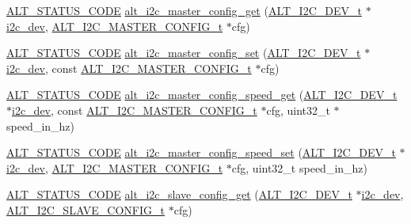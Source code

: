 \begin{DoxyCompactItemize}
\item 
\mbox{\hyperlink{hwlib_8h_abdb0d369f069723ca55d6c94bcaaaa12}{A\+L\+T\+\_\+\+S\+T\+A\+T\+U\+S\+\_\+\+C\+O\+DE}} \mbox{\hyperlink{group__ALT__I2C_ga33fc9aa9f017d7ae7eb0779415e9d69f}{alt\+\_\+i2c\+\_\+master\+\_\+config\+\_\+get}} (\mbox{\hyperlink{structALT__I2C__DEV__s}{A\+L\+T\+\_\+\+I2\+C\+\_\+\+D\+E\+V\+\_\+t}} $\ast$\mbox{\hyperlink{structi2c__dev}{i2c\+\_\+dev}}, \mbox{\hyperlink{group__ALT__I2C_ga4f317dbba3080bb537f6c145ca30d503}{A\+L\+T\+\_\+\+I2\+C\+\_\+\+M\+A\+S\+T\+E\+R\+\_\+\+C\+O\+N\+F\+I\+G\+\_\+t}} $\ast$cfg)
\item 
\mbox{\hyperlink{hwlib_8h_abdb0d369f069723ca55d6c94bcaaaa12}{A\+L\+T\+\_\+\+S\+T\+A\+T\+U\+S\+\_\+\+C\+O\+DE}} \mbox{\hyperlink{group__ALT__I2C_gae1e81c86d394a6cc962598e3e32931d5}{alt\+\_\+i2c\+\_\+master\+\_\+config\+\_\+set}} (\mbox{\hyperlink{structALT__I2C__DEV__s}{A\+L\+T\+\_\+\+I2\+C\+\_\+\+D\+E\+V\+\_\+t}} $\ast$\mbox{\hyperlink{structi2c__dev}{i2c\+\_\+dev}}, const \mbox{\hyperlink{group__ALT__I2C_ga4f317dbba3080bb537f6c145ca30d503}{A\+L\+T\+\_\+\+I2\+C\+\_\+\+M\+A\+S\+T\+E\+R\+\_\+\+C\+O\+N\+F\+I\+G\+\_\+t}} $\ast$cfg)
\item 
\mbox{\hyperlink{hwlib_8h_abdb0d369f069723ca55d6c94bcaaaa12}{A\+L\+T\+\_\+\+S\+T\+A\+T\+U\+S\+\_\+\+C\+O\+DE}} \mbox{\hyperlink{group__ALT__I2C_ga90d8a89d7b447bede11a9c1c79ea3b99}{alt\+\_\+i2c\+\_\+master\+\_\+config\+\_\+speed\+\_\+get}} (\mbox{\hyperlink{structALT__I2C__DEV__s}{A\+L\+T\+\_\+\+I2\+C\+\_\+\+D\+E\+V\+\_\+t}} $\ast$\mbox{\hyperlink{structi2c__dev}{i2c\+\_\+dev}}, const \mbox{\hyperlink{group__ALT__I2C_ga4f317dbba3080bb537f6c145ca30d503}{A\+L\+T\+\_\+\+I2\+C\+\_\+\+M\+A\+S\+T\+E\+R\+\_\+\+C\+O\+N\+F\+I\+G\+\_\+t}} $\ast$cfg, uint32\+\_\+t $\ast$speed\+\_\+in\+\_\+hz)
\item 
\mbox{\hyperlink{hwlib_8h_abdb0d369f069723ca55d6c94bcaaaa12}{A\+L\+T\+\_\+\+S\+T\+A\+T\+U\+S\+\_\+\+C\+O\+DE}} \mbox{\hyperlink{group__ALT__I2C_gab7a9d3d9d126cce421b7a9e0254b2a6e}{alt\+\_\+i2c\+\_\+master\+\_\+config\+\_\+speed\+\_\+set}} (\mbox{\hyperlink{structALT__I2C__DEV__s}{A\+L\+T\+\_\+\+I2\+C\+\_\+\+D\+E\+V\+\_\+t}} $\ast$\mbox{\hyperlink{structi2c__dev}{i2c\+\_\+dev}}, \mbox{\hyperlink{group__ALT__I2C_ga4f317dbba3080bb537f6c145ca30d503}{A\+L\+T\+\_\+\+I2\+C\+\_\+\+M\+A\+S\+T\+E\+R\+\_\+\+C\+O\+N\+F\+I\+G\+\_\+t}} $\ast$cfg, uint32\+\_\+t speed\+\_\+in\+\_\+hz)
\item 
\mbox{\hyperlink{hwlib_8h_abdb0d369f069723ca55d6c94bcaaaa12}{A\+L\+T\+\_\+\+S\+T\+A\+T\+U\+S\+\_\+\+C\+O\+DE}} \mbox{\hyperlink{group__ALT__I2C_ga2db2575ff493909f71d05f9aa37848b6}{alt\+\_\+i2c\+\_\+slave\+\_\+config\+\_\+get}} (\mbox{\hyperlink{structALT__I2C__DEV__s}{A\+L\+T\+\_\+\+I2\+C\+\_\+\+D\+E\+V\+\_\+t}} $\ast$\mbox{\hyperlink{structi2c__dev}{i2c\+\_\+dev}}, \mbox{\hyperlink{group__ALT__I2C_ga9c0d22378cb1d6eb0194ca424026081d}{A\+L\+T\+\_\+\+I2\+C\+\_\+\+S\+L\+A\+V\+E\+\_\+\+C\+O\+N\+F\+I\+G\+\_\+t}} $\ast$cfg)

\end{DoxyCompactItemize}

